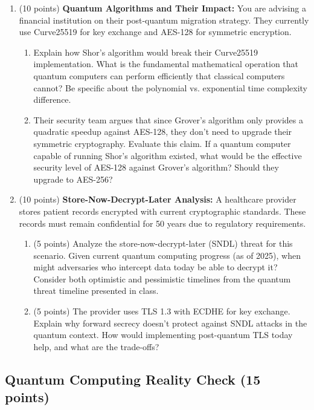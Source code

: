 \documentclass[10pt,a4paper,american]{exam}
\begin{document}
\begin{enumerate}
	\item (10 points) \textbf{Quantum Algorithms and Their Impact:}
	      You are advising a financial institution on their post-quantum migration strategy. They currently use Curve25519 for key exchange and AES-128 for symmetric encryption.
	      \begin{enumerate}
		      \item Explain how Shor's algorithm would break their Curve25519 implementation. What is the fundamental mathematical operation that quantum computers can perform efficiently that classical computers cannot? Be specific about the polynomial vs. exponential time complexity difference.
		      \item Their security team argues that since Grover's algorithm only provides a quadratic speedup against AES-128, they don't need to upgrade their symmetric cryptography. Evaluate this claim. If a quantum computer capable of running Shor's algorithm existed, what would be the effective security level of AES-128 against Grover's algorithm? Should they upgrade to AES-256?
	      \end{enumerate}
	\item (10 points) \textbf{Store-Now-Decrypt-Later Analysis:}
	      A healthcare provider stores patient records encrypted with current cryptographic standards. These records must remain confidential for 50 years due to regulatory requirements.

	      \begin{enumerate}
		      \item (5 points) Analyze the store-now-decrypt-later (SNDL) threat for this scenario. Given current quantum computing progress (as of 2025), when might adversaries who intercept data today be able to decrypt it? Consider both optimistic and pessimistic timelines from the quantum threat timeline presented in class.
		      \item (5 points) The provider uses TLS 1.3 with ECDHE for key exchange. Explain why forward secrecy doesn't protect against SNDL attacks in the quantum context. How would implementing post-quantum TLS today help, and what are the trade-offs?
	      \end{enumerate}
\end{enumerate}

\subsection{Quantum Computing Reality Check (15 points)}
\end{document}
